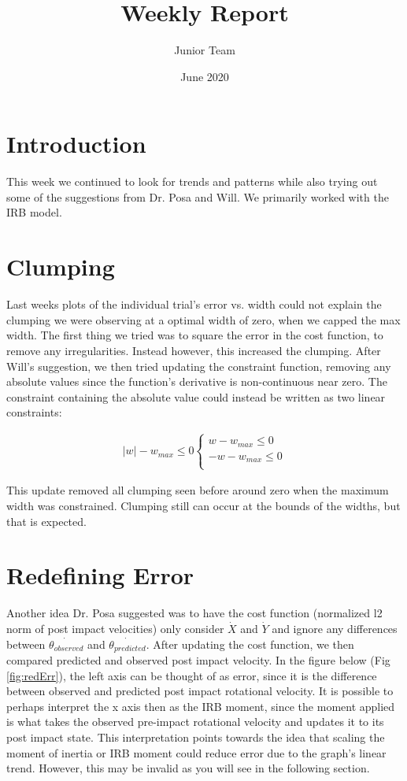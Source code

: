 \documentclass{article}
\title{Weekly Report}
\author{Junior Team }
\date{June 2020}
\begin{document}
\maketitle

\section*{Introduction}
This week we continued to look for trends and patterns while also trying out some of the suggestions from Dr. Posa and Will. We primarily worked with the IRB model. 

\section{Clumping}
Last weeks plots of the individual trial's error vs. width could not explain the clumping we were observing at a optimal width of zero, when we capped the max width. The first thing we tried was to square the error in the cost function, to remove any irregularities. Instead however, this increased the clumping. After Will's suggestion, we then tried updating the constraint function, removing any absolute values since the function's derivative is non-continuous near zero. The constraint containing the absolute value could instead be written as two linear constraints:

\begin{align}
 |w| - w_{max} \leq 0
    \begin{cases}
       w - w_{max} \leq 0 \\
      -w - w_{max} \leq 0\\
    \end{cases} 
\end{align}

\noindent This update removed all clumping seen before around zero when the maximum width was constrained. Clumping still can occur at the bounds of the widths, but that is expected. 

\section{Redefining Error}
Another idea Dr. Posa suggested was to have the cost function (normalized l2 norm of post impact velocities) only consider $\dot{X}$ and $\dot{Y}$ and ignore any differences between $\dot{\theta_{observed}}$ and $\dot{\theta_{predicted}}$. After updating the cost function, we then compared predicted and observed post impact velocity. In the figure below (Fig \ref{fig:redErr}), the left axis can be thought of as error, since it is the difference between observed and predicted post impact rotational velocity. It is possible to perhaps interpret the x axis then as the IRB moment, since the moment applied is what takes the observed pre-impact rotational velocity and updates it to its post impact state. This interpretation points towards the idea that scaling the moment of inertia or IRB moment could reduce error due to the graph's linear trend. However, this may be invalid as you will see in the following section.
\end{document}
